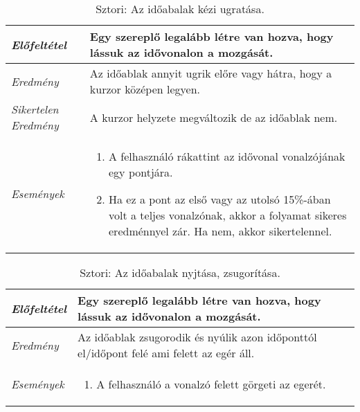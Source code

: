 \begin{table}[H]
	\centering
	\begin{tabular}{ | m{} | m{} | }
		\hline
		\emph{Előfeltétel} & Egy szereplő legalább létre van hozva, hogy lássuk az idővonalon a mozgását.\\
		\hline
		\emph{Eredmény} & Az időablak annyit ugrik előre vagy hátra, hogy a kurzor középen legyen. \\
		\hline
		\emph{Sikertelen Eredmény} & A kurzor helyzete megváltozik de az időablak nem.  \\
		\hline
		\hline
		\emph{Események} &

		\begin{enumerate}[itemsep=-1ex]
			\item A felhasználó rákattint az idővonal vonalzójának egy pontjára.
			\item Ha ez a pont az első vagy az utolsó 15\%-ában volt a teljes vonalzónak, akkor a folyamat sikeres eredménnyel zár. Ha nem, akkor sikertelennel.
		\end{enumerate}
		\\
		\hline
	\end{tabular}
	\caption{Sztori: Az időabalak kézi ugratása.}
	\label{tab:story-timeline-manual-jump}
\end{table}

\begin{table}[H]
	\centering
	\begin{tabular}{ | m{} | m{} | }
		\hline
		\emph{Előfeltétel} & Egy szereplő legalább létre van hozva, hogy lássuk az idővonalon a mozgását.\\
		\hline
		\emph{Eredmény} & Az időablak zsugorodik és nyúlik azon időponttól el/időpont felé ami felett az egér áll. \\
		\hline
		\hline
		\emph{Események} &

		\begin{enumerate}[itemsep=-1ex]
			\item A felhasználó a vonalzó felett görgeti az egerét.
		\end{enumerate}
		\\
		\hline
	\end{tabular}
	\caption{Sztori: Az időabalak nyjtása, zsugorítása.}
	\label{tab:story-timeline-zoom}
\end{table}


